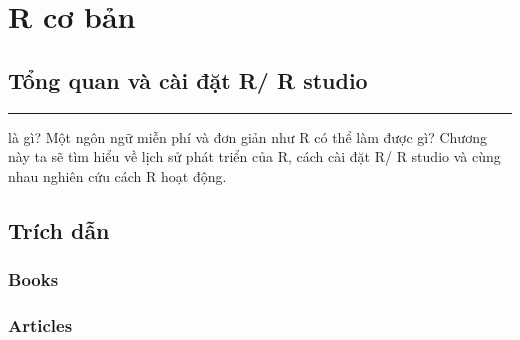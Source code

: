 \documentclass[11pt,fleqn]{book} %
\begin{document}
\pagestyle{empty} %

\tableofcontents %

\cleardoublepage %

\pagestyle{fancy} %


\part{R cơ bản}
    
    
    \chapter{Tổng quan và cài đặt R/ R studio}
        \hrule
        \vspace*{2cm}
        \normalsize
         là gì? Một ngôn ngữ miễn phí và đơn giản như R có thể làm được gì? Chương này ta sẽ tìm hiểu về lịch sử phát triển của R, cách cài đặt R/ R studio và cùng nhau nghiên cứu cách R hoạt động.
        \pagebreak
        
        
    

\chapter*{Trích dẫn}
\section*{Books}
\printbibliography[heading=bibempty,type=book]
\section*{Articles}
\printbibliography[heading=bibempty,type=article]


\cleardoublepage
{}
\setlength{\columnsep}{0.75cm}
\printindex

\end{document}
